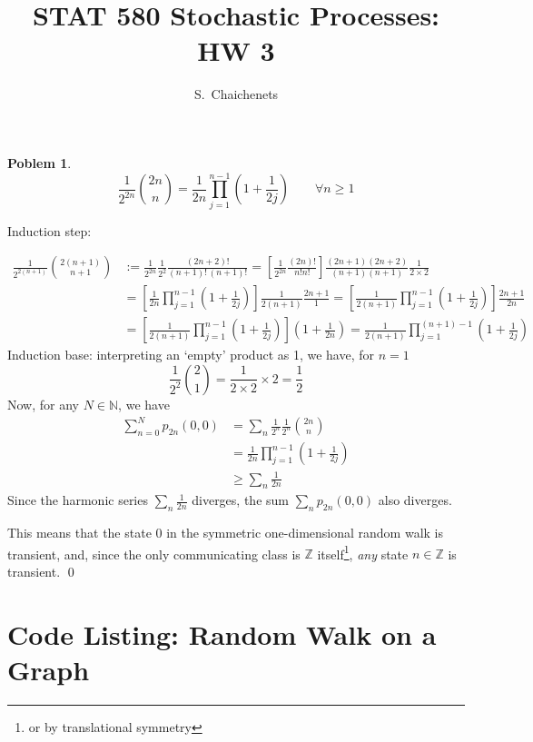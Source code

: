 \documentclass[8pt,notitlepage]{report}
\newtheorem{problem}{Poblem}
\newenvironment{solution}[1][Solution]{\begin{trivlist}
    \item[\hskip \labelsep {\bfseries #1}]}{\end{trivlist}}
\begin{document}
\title{STAT 580 Stochastic Processes: HW 3}
\author{ S.\ Chaichenets }
\maketitle



\begin{problem}
\small
\begin{equation}
\frac{1}{2^{2n}} {2n \choose n} = \frac{1}{2n} \prod_{j=1}^{n-1} \left(1+\frac{1}{2j}\right)
\qquad \forall n\geq 1
\end{equation}
\normalsize
\end{problem}

\begin{solution}
Induction step:

\begin{equation}
\begin{split}
\frac{1}{2^{2(n+1)}} {2(n+1) \choose n+1} 
	& := \frac{1}{2^{2n}}\frac{1}{2^2} \frac{(2n+2)!}{(n+1)!\,(n+1)!} 
	 = \left[ \frac{1}{2^{2n}}\frac{(2n)!}{n!n!} \right]
		\frac{(2n+1)(2n+2)}{(n+1)(n+1)}\frac{1}{2\times2} 			\\
	& = \left[ \frac{1}{2n}\prod_{j=1}^{n-1} \left(1+\frac{1}{2j}\right) \right]
		\frac{1}{2(n+1)}\frac{2n+1}{1} 
	 = \left[ \frac{1}{2(n+1)}\prod_{j=1}^{n-1} \left(1+\frac{1}{2j}\right) \right]
		\frac{2n+1}{2n}								\\
	& = \left[ \frac{1}{2(n+1)}\prod_{j=1}^{n-1} \left(1+\frac{1}{2j}\right) \right]
		\left( 1 + \frac{1}{2n} \right)
	 = \frac{1}{2(n+1)}\prod_{j=1}^{(n+1)-1} \left(1+\frac{1}{2j}\right)
\end{split}
\end{equation}
Induction base: interpreting an `empty' product as 1, we have, for $n=1$
$$
\frac{1}{2^2}{2 \choose 1} = \frac{1}{2\times2} \times 2 = \frac{1}{2}
$$
Now, for any $N\in \mathbb{N}$, we have
\begin{equation}
\begin{split}
\sum_{n=0}^{N} p_{2n}(0,0) &= \sum_n \frac{1}{2^n}\frac{1}{2^n}{2n \choose n}		\\
			&= \frac{1}{2n} \prod_{j=1}^{n-1} \left(1+\frac{1}{2j}\right)	\\
			&\geq	\sum_{n}\frac{1}{2n}
\end{split}
\end{equation}
Since the harmonic series $\sum_n \frac{1}{2n}$ diverges, 
the sum $\sum_{n} p_{2n}(0,0)$ also diverges.

This means that the state $0$ in the symmetric one-dimensional random walk is transient,
and, since the only communicating class is $\mathbb{Z}$ itself\footnote{
	or by translational symmetry
}, {\it any} state $n\in \mathbb{Z}$ is transient.
\qed
\end{solution}

\newpage
\appendix
\section*{Code Listing: Random Walk on a Graph}

\end{document}
